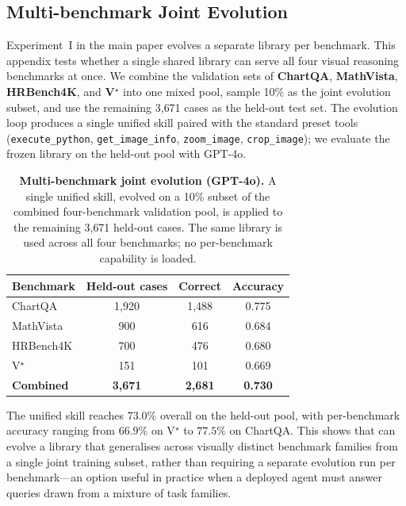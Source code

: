 \subsection{Multi-benchmark Joint Evolution}
\label{app:mixed_benchmark}

Experiment~I in the main paper evolves a separate library per benchmark. This appendix
tests whether a single shared library can serve all four visual reasoning benchmarks at
once. We combine the validation sets of \textbf{ChartQA}, \textbf{MathVista},
\textbf{HRBench4K}, and \textbf{V$^\star$} into one mixed pool, sample 10\% as the joint
evolution subset, and use the remaining 3{,}671 cases as the held-out test set. The
evolution loop produces a single unified skill paired with the standard preset tools
(\texttt{execute\_python}, \texttt{get\_image\_info}, \texttt{zoom\_image},
\texttt{crop\_image}); we evaluate the frozen library on the held-out pool with GPT-4o.

\begin{table}[ht]
\centering
\small
\setlength{\tabcolsep}{4pt}
\renewcommand{\arraystretch}{1.12}
\begin{tabular}{lccc}
\toprule
\textbf{Benchmark} & \textbf{Held-out cases} & \textbf{Correct} & \textbf{Accuracy} \\
\midrule
ChartQA      & 1{,}920 & 1{,}488 & 0.775 \\
MathVista    &    900 &     616 & 0.684 \\
HRBench4K      &    700 &     476 & 0.680 \\
V$^\star$    &    151 &     101 & 0.669 \\
\midrule
\textbf{Combined} & \textbf{3{,}671} & \textbf{2{,}681} & \textbf{0.730} \\
\bottomrule
\end{tabular}
\caption{%
  \textbf{Multi-benchmark joint evolution (GPT-4o).}
  A single unified skill, evolved on a 10\% subset of the combined four-benchmark
  validation pool, is applied to the remaining 3{,}671 held-out cases. The same library
  is used across all four benchmarks; no per-benchmark capability is loaded.
}
\label{tab:mixed_benchmark}
\end{table}

The unified skill reaches $73.0\%$ overall on the held-out pool, with per-benchmark
accuracy ranging from $66.9\%$ on V$^\star$ to $77.5\%$ on ChartQA. This shows that
\sysname{} can evolve a library that generalises across visually distinct benchmark
families from a single joint training subset, rather than requiring a separate evolution
run per benchmark---an option useful in practice when a deployed agent must answer
queries drawn from a mixture of task families.

